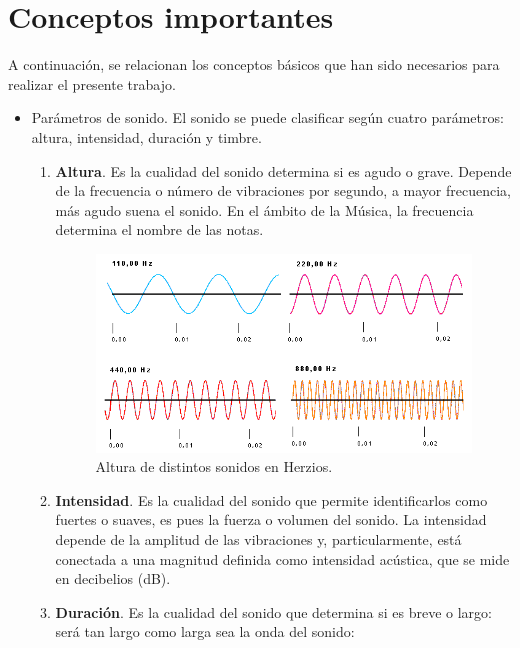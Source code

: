 \documentclass[a4paper, openright, 11pt, titlepage]{report}
\theoremstyle{definition}\newtheorem{defin}[propo]{Definition}
\theoremstyle{definition}\newtheorem{obser}[propo]{Remark}
\theoremstyle{definition}\newtheorem{ejem}[propo]{Ejemplo}
\theoremstyle{definition}\newtheorem{algoritmo}[propo]{Algoritmo}
\begin{document}
\chapter{Conceptos importantes}\label{aped.A}
A continuación, se relacionan los conceptos básicos que han sido necesarios para realizar el presente trabajo.
\begin{itemize}
    \item Parámetros de sonido. El sonido se puede clasificar según cuatro parámetros: altura, intensidad, duración y timbre.
    \begin{enumerate}
        \item \textbf{Altura}. Es la cualidad del sonido determina si es agudo o grave. Depende de la frecuencia o número de vibraciones por segundo, a mayor frecuencia, más agudo suena el sonido. En el ámbito de la Música, la frecuencia determina el nombre de las notas.
        \begin{figure}[H]
            \centering
            \includegraphics[scale = 0.7]{Images/Apéndices/Apéndice A/alturaSonido.png}
            \caption{Altura de distintos sonidos en Herzios. \cite{altura}}
        \end{figure}
        \item \textbf{Intensidad}. Es la cualidad del sonido que permite identificarlos como fuertes o suaves, es pues la fuerza o volumen del sonido. La intensidad depende de la amplitud de las vibraciones y, particularmente, está conectada a una magnitud definida como intensidad acústica, que se mide en decibelios (dB).
        \item \textbf{Duración}. Es la cualidad del sonido que determina si es breve o largo: será tan largo como larga sea la onda del sonido:
        \begin{figure}[H]
            \centering

\end{figure}
\end{enumerate}
\end{itemize}
\end{document}
